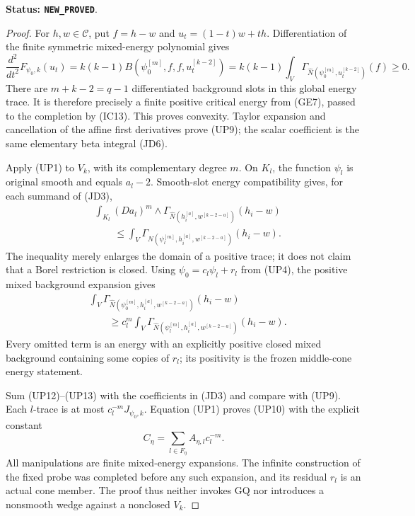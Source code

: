 \documentclass[11pt,a4paper]{article}
\numberwithin{equation}{section}
\theoremstyle{definition}
\theoremstyle{remark}
\begin{document}
\noindent\textbf{Status: \texttt{NEW\_PROVED}}.

\begin{proof}
For $h,w\in\mathcal C$, put $f=h-w$ and $u_t=(1-t)w+th$.
Differentiation of the finite symmetric mixed-energy polynomial
gives
\[
 \frac{d^2}{dt^2}F_{\psi_0,k}(u_t)
  =k(k-1)B(\psi_0^{[m]},f,f,u_t^{[k-2]})
  =k(k-1)\int_V
        \Gamma_{\widehat N(\psi_0^{[m]},u_t^{[k-2]})}(f)\geq0.
 \tag{UP11}
\]
There are $m+k-2=q-1$ differentiated background slots in this
global energy trace.  It is therefore precisely a finite positive
critical energy from (GE7), passed to the completion by (IC13).
This proves convexity.  Taylor expansion and cancellation of
the affine first derivatives prove (UP9); the scalar coefficient
is the same elementary beta integral (JD6).

Apply (UP1) to $V_k$, with its complementary degree $m$.
On $K_l$, the function $\psi_l$ is original smooth and equals
$a_l-2$.  Smooth-slot energy compatibility gives, for each
summand of (JD3),
\[
 \begin{split}
 &\int_{K_l}(Da_l)^m\wedge
     \Gamma_{\widehat N(h_i^{[a]},w^{[k-2-a]})}(h_i-w)\\
 &\qquad\leq
     \int_V\Gamma_{\widehat N(\psi_l^{[m]},h_i^{[a]},
                                         w^{[k-2-a]})}(h_i-w).
 \end{split}
 \tag{UP12}
\]
The inequality merely enlarges the domain of a positive trace;
it does not claim that a Borel restriction is closed.
Using $\psi_0=c_l\psi_l+r_l$ from (UP4), the positive mixed
background expansion gives
\[
 \begin{split}
 &\int_V\Gamma_{\widehat N(\psi_0^{[m]},h_i^{[a]},
                                       w^{[k-2-a]})}(h_i-w)\\
 &\qquad\geq c_l^m
     \int_V\Gamma_{\widehat N(\psi_l^{[m]},h_i^{[a]},
                                         w^{[k-2-a]})}(h_i-w).
 \end{split}
 \tag{UP13}
\]
Every omitted term is an energy with an explicitly positive
closed mixed background containing some copies of $r_l$;
its positivity is the frozen middle-cone energy statement.

Sum (UP12)--(UP13) with the coefficients in (JD3) and compare
with (UP9).  Each $l$-trace is at most $c_l^{-m}J_{\psi_0,k}$.
Equation (UP1) proves (UP10) with the explicit constant
\[
                       C_\eta=
                   \sum_{l\in F_\eta}A_{\eta,l}c_l^{-m}.
 \tag{UP14}
\]
All manipulations are finite mixed-energy expansions.  The
infinite construction of the fixed probe was completed before
any such expansion, and its residual $r_l$ is an actual cone
member.  The proof thus neither invokes GQ nor introduces a
nonsmooth wedge against a nonclosed $V_k$.
\end{proof}
\end{document}
